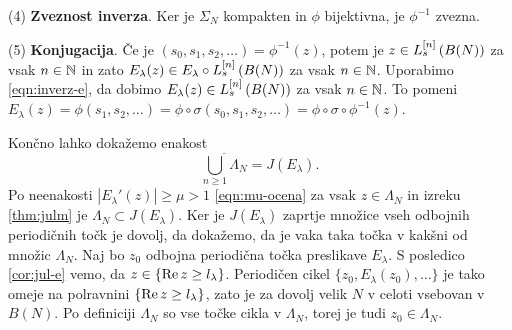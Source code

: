 \begin{dokaz}
    (4) \textbf{Zveznost inverza}. Ker je \(\Sigma_N\) kompakten in \(\phi\) bijektivna, je \(\phi^{-1}\) zvezna.

    (5) \textbf{Konjugacija}. Če je \((s_0, s_1, s_2, \dots) = \phi^{-1} (z)\), potem je \(z \in L_s^{[n]} \left( B (N) \right)\) za vsak \(n \in \mathbb N\) in zato \(E_\lambda (z) \in E_\lambda \circ L_s^{[n]} \left( B (N) \right)\) za vsak \(n \in \mathbb N\). Uporabimo \eqref{eqn:inverz-e}, da dobimo \(E_\lambda (z) \in L_s^{[n]} \left( B (N) \right)\) za vsak \(n \in \mathbb N\). To pomeni \(E_\lambda (z) = \phi (s_1, s_2, \dots) = \phi \circ \sigma (s_0, s_1, s_2, \dots) = \phi \circ \sigma \circ \phi^{-1} (z)\).
\end{dokaz}

\noindent Končno lahko dokažemo enakost
\[\overline{\bigcup_{n \geq 1} \Lambda_N} = J (E_\lambda).\]
Po neenakosti \(|E_\lambda' (z)| \geq \mu > 1\) \eqref{eqn:mu-ocena} za vsak \(z \in \Lambda_N\) in izreku \ref{thm:julm} je \(\Lambda_N \subset J (E_\lambda)\). Ker je \(J (E_\lambda)\) zaprtje množice vseh odbojnih periodičnih točk je dovolj, da dokažemo, da je vaka taka točka v kakšni od množic \(\Lambda_N\). Naj bo \(z_0\) odbojna periodična točka preslikave \(E_\lambda\). S posledico \ref{cor:jul-e} vemo, da \(z \in \{\operatorname{Re} z \geq l_\lambda\}\). Periodičen cikel \(\{z_0, E_\lambda (z_0), \dots\}\) je tako omeje na polravnini \(\{\operatorname{Re} z \geq l_\lambda\}\), zato je za dovolj velik \(N\) v celoti vsebovan v \(B (N)\). Po definiciji \(\Lambda_N\) so vse točke cikla v \(\Lambda_N\), torej je tudi \(z_0 \in \Lambda_N\).


